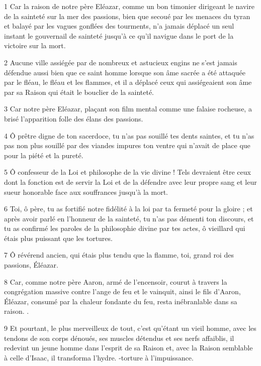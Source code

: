 \par 1 Car la raison de notre père Eléazar, comme un bon timonier dirigeant le navire de la sainteté sur la mer des passions, bien que secoué par les menaces du tyran et balayé par les vagues gonflées des tourments, n'a jamais déplacé un seul instant le gouvernail de sainteté jusqu'à ce qu'il navigue dans le port de la victoire sur la mort.

\par 2 Aucune ville assiégée par de nombreux et astucieux engins ne s'est jamais défendue aussi bien que ce saint homme lorsque son âme sacrée a été attaquée par le fléau, le fléau et les flammes, et il a déplacé ceux qui assiégeaient son âme par sa Raison qui était le bouclier de la sainteté.

\par 3 Car notre père Eléazar, plaçant son film mental comme une falaise rocheuse, a brisé l'apparition folle des élans des passions.

\par 4 Ô prêtre digne de ton sacerdoce, tu n'as pas souillé tes dents saintes, et tu n'as pas non plus souillé par des viandes impures ton ventre qui n'avait de place que pour la piété et la pureté.

\par 5 Ô confesseur de la Loi et philosophe de la vie divine ! Tels devraient être ceux dont la fonction est de servir la Loi et de la défendre avec leur propre sang et leur sueur honorable face aux souffrances jusqu'à la mort.

\par 6 Toi, ô père, tu as fortifié notre fidélité à la loi par ta fermeté pour la gloire ; et après avoir parlé en l'honneur de la sainteté, tu n'as pas démenti ton discours, et tu as confirmé les paroles de la philosophie divine par tes actes, ô vieillard qui étais plus puissant que les tortures.

\par 7 Ô révérend ancien, qui étais plus tendu que la flamme, toi, grand roi des passions, Éléazar.

\par 8 Car, comme notre père Aaron, armé de l'encensoir, courut à travers la congrégation massive contre l'ange de feu et le vainquit, ainsi le fils d'Aaron, Éléazar, consumé par la chaleur fondante du feu, resta inébranlable dans sa raison. .

\par 9 Et pourtant, le plus merveilleux de tout, c'est qu'étant un vieil homme, avec les tendons de son corps dénoués, ses muscles détendus et ses nerfs affaiblis, il redevint un jeune homme dans l'esprit de sa Raison et, avec la Raison semblable à celle d'Isaac, il transforma l'hydre. -torture à l'impuissance.

